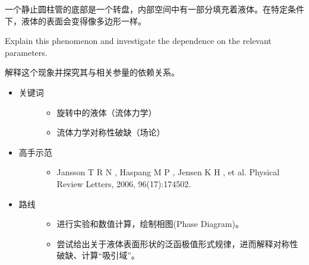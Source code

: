 \documentclass[a4paper,10pt,english]{sphinxmanual}
\begin{document}
一个静止圆柱管的底部是一个转盘，内部空间中有一部分填充着液体。在特定条件下，液体的表面会变得像多边形一样。

Explain this phenomenon and investigate the dependence on the relevant parameters.

解释这个现象并探究其与相关参量的依赖关系。

\noindent{}
\begin{itemize}
\item {} \begin{description}
\item[{关键词}] \leavevmode\begin{itemize}
\item {} 
旋转中的液体（流体力学）

\item {} 
流体力学对称性破缺（场论）

\end{itemize}

\end{description}

\item {} \begin{description}
\item[{高手示范}] \leavevmode\begin{itemize}
\item {} 
Jansson T R N , Haspang M P , Jensen K H , et al.  Physical Review Letters, 2006, 96(17):174502.

\end{itemize}

\end{description}

\item {} \begin{description}
\item[{路线}] \leavevmode\begin{itemize}
\item {} 
进行实验和数值计算，绘制相图(Phase Diagram)。

\item {} 
尝试给出关于液体表面形状的泛函极值形式规律，进而解释对称性破缺、计算“吸引域”。

\end{itemize}

\end{description}

\end{itemize}
\end{document}
